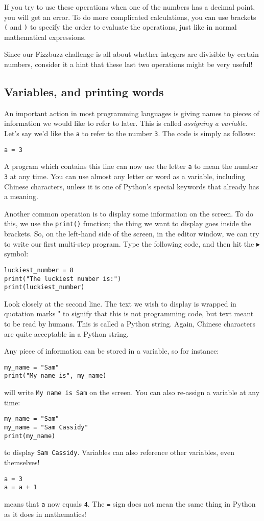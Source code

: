 \documentclass[a4paper]{article}
\begin{document}
If you try to use these operations when one of the numbers has a decimal point, you will get an error. To do more complicated calculations, you can use brackets \verb|(| and \verb|)| to specify the order to evaluate the operations, just like in normal mathematical expressions.

Since our Fizzbuzz challenge is all about whether integers are divisible by certain numbers, consider it a hint that these last two operations might be very useful!

\subsection{Variables, and printing words}

An important action in most programming languages is giving names to pieces of information we would like to refer to later. This is called \emph{assigning a variable}. Let's say we'd like the \verb|a| to refer to the number \verb|3|. The code is simply as follows:
\begin{lstlisting}
a = 3
\end{lstlisting}

A program which contains this line can now use the letter \verb|a| to mean the number \verb|3| at any time. You can use almost any letter or word as a variable, including Chinese characters, unless it is one of Python's special keywords that already has a meaning. 

Another common operation is to display some information on the screen. To do this, we use the \verb|print()| function; the thing we want to display goes inside the brackets. So, on the left-hand side of the screen, in the editor window, we can try to write our first multi-step program. Type the following code, and then hit the $\blacktriangleright$ symbol:
\begin{lstlisting}
luckiest_number = 8
print("The luckiest number is:")
print(luckiest_number)
\end{lstlisting}
Look closely at the second line. The text we wish to display is wrapped in quotation marks " to signify that this is not programming code, but text meant to be read by humans. This is called a Python string. Again, Chinese characters are quite acceptable in a Python string.

Any piece of information can be stored in a variable, so for instance:
\begin{lstlisting}
my_name = "Sam"
print("My name is", my_name)
\end{lstlisting}
\noindent will write \verb|My name is Sam| on the screen. You can also re-assign a variable at any time:
\begin{lstlisting}
my_name = "Sam"
my_name = "Sam Cassidy"
print(my_name)
\end{lstlisting}
\noindent to display \verb|Sam Cassidy|. Variables can also reference other variables, even themselves!
\begin{lstlisting}
a = 3
a = a + 1
\end{lstlisting}
\noindent means that \verb|a| now equals \verb|4|. The \verb|=| sign does not mean the same thing in Python as it does in mathematics!
\end{document}
